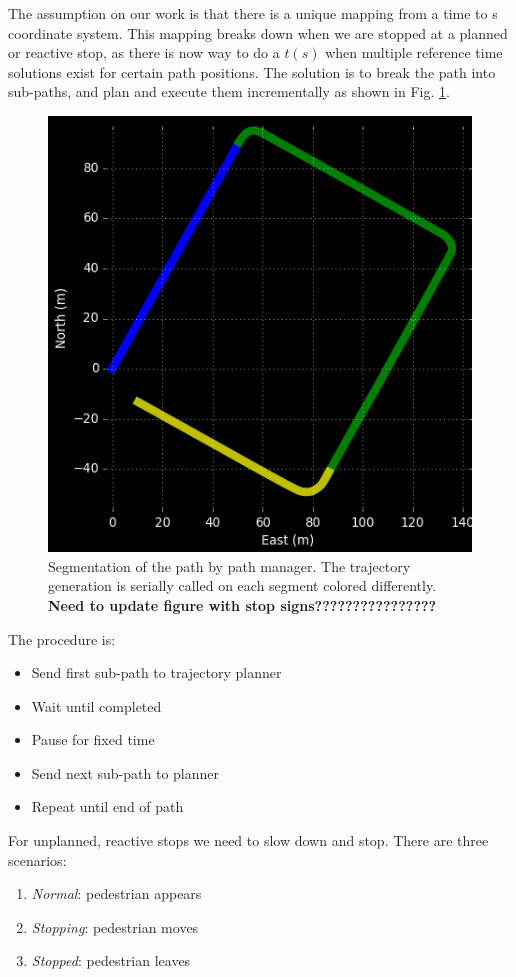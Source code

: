 \documentclass[letterpaper, 10 pt, conference]{ieeeconf}  %
\begin{document}
The assumption on our work is that there is a unique mapping from a time to s coordinate 
system.
This mapping breaks down when we are stopped at a planned or reactive stop, as there is now way to do a $t(s)$ when multiple reference time solutions exist for certain path positions.
The solution is to break the path into sub-paths, and plan and execute them incrementally as shown in Fig. \ref{fig:segmentation}.

\begin{figure}[thpb]
  \centering
  \includegraphics[width=0.5\columnwidth]{graphics/Subpaths.png}
  \caption{Segmentation of the path by path manager. The trajectory generation is serially called on each segment colored differently. \textbf{Need to update figure with stop signs????????????????}
  }
  \label{fig:segmentation}
\end{figure}

The procedure is:
\begin{itemize}
\item Send first sub-path to trajectory planner
\item Wait until completed
\item Pause for fixed time
\item Send next sub-path to planner
\item Repeat until end of path
\end{itemize}

For unplanned, reactive stops  we need to slow down and stop. 
There are three scenarios:
\begin{enumerate}
\item \emph{Normal}: pedestrian appears
\item \emph{Stopping}: pedestrian moves
\item \emph{Stopped}: pedestrian leaves
\end{enumerate}
\end{document}
